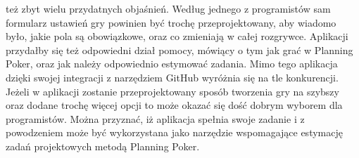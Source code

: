 też zbyt wielu przydatnych objaśnień. Według jednego z programistów sam formularz ustawień gry powinien
być trochę przeprojektowany, aby wiadomo było, jakie pola są obowiązkowe, oraz co zmieniają w całej
rozgrywce.
Aplikacji przydałby się też odpowiedni dział pomocy, mówiący o tym jak grać w Planning Poker, oraz jak
należy odpowiednio estymować zadania. Mimo tego aplikacja dzięki swojej integracji z narzędziem GitHub
wyróżnia się na tle konkurencji. Jeżeli w aplikacji zostanie przeprojektowany sposób tworzenia gry na szybszy
oraz dodane trochę więcej opcji to może okazać się dość dobrym wyborem dla programistów.
Można przyznać, iż aplikacja spełnia swoje zadanie i z powodzeniem może być wykorzystana jako
narzędzie wspomagające estymację zadań projektowych metodą Planning Poker.
